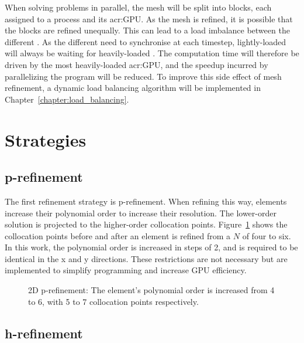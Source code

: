 When solving problems in parallel, the mesh will be split into blocks, each assigned to a process
and its \acrshort{acr:GPU}. As the mesh is refined, it is possible that the blocks are refined
unequally. This can lead to a load imbalance between the different . As the
different  need to synchronise at each timestep, lightly-loaded
 will always be waiting for heavily-loaded . The computation
time will therefore be driven by the most heavily-loaded \acrshort{acr:GPU}, and the speedup
incurred by parallelizing the program will be reduced. To improve this side effect of mesh
refinement, a dynamic load balancing algorithm will be implemented in
Chapter~\ref{chapter:load_balancing}.

\section{Strategies}\label{section:adaptive_mesh_refinement:refinement_strategies}

\subsection{p-refinement}\label{subsection:adaptive_mesh_refinement:refinement_strategies:p-refinement}

The first refinement strategy is p-refinement. When refining this way, elements increase their
polynomial order to increase their resolution. The lower-order solution is projected to the
higher-order collocation points. Figure~\ref{fig:p-refinement} shows the collocation points before
and after an element is refined from a \(N\) of four to six. In this work, the polynomial order is
increased in steps of 2, and is required to be identical in the x and y directions. These
restrictions are not necessary but are implemented to simplify programming and increase GPU
efficiency.

\begin{figure}[H]
    \centering
    
    \caption{2D p-refinement: The element's polynomial order is increased from 4 to 6, with 5 to 7 collocation points respectively.}\label{fig:p-refinement}
\end{figure}

\subsection{h-refinement}\label{subsection:adaptive_mesh_refinement:refinement_strategies:h-refinement}

